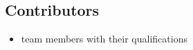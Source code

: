 \subsection{Contributors}

\begin{itemize}
    \item team members with their qualifications
\end{itemize}
